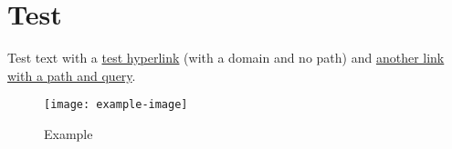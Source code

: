 \chapter{Test}

Test text with a \href{https://www.dickimaw-books.com/}{test hyperlink}
(with a domain and no path) and 
\href{https://www.dickimaw-books.com/booklist.php?book_id=14}{another
link with a path and query}.

\begin{figure}
\centering
\texttt{[image: example-image]}
\caption{Example}\label{fig:example}
\end{figure}
